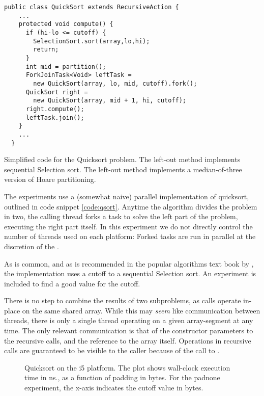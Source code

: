 \begin{code}
\begin{Verbatim}[frame=single]
  public class QuickSort extends RecursiveAction {
    ...
    protected void compute() {
      if (hi-lo <= cutoff) {
        SelectionSort.sort(array,lo,hi);
        return;
      }
      int mid = partition();
      ForkJoinTask<Void> leftTask =
        new QuickSort(array, lo, mid, cutoff).fork();
      QuickSort right =
        new QuickSort(array, mid + 1, hi, cutoff);
      right.compute();
      leftTask.join();
    }
    ...
  }
\end{Verbatim}
	\caption{Simplified code for the Quicksort problem. The left-out
	 method implements sequential Selection sort.
	The left-out  method implements a median-of-three
	version of Hoare partitioning.}
	\label{code:qsort}
\end{code}

The experiments use a (somewhat naive) parallel implementation of quicksort,
outlined in code snippet \ref{code:qsort}.
Anytime the algorithm divides the problem in two, the calling thread forks a
task to solve the left part of the problem, executing the right part itself.
In this experiment we do not directly control the number of threads used on each
platform: Forked tasks are run in parallel at the discretion of the
.

As is common, and as is recommended in the popular algorithms text book by
\citet{sedgewick}, the implementation uses a cutoff to a sequential Selection
sort. An experiment is included to find a good value for the cutoff.

There is no step to combine the results of two subproblems, as calls operate
in-place on the same shared array. While this may \textit{seem} like communication
between threads, there is only a single thread operating on a given
array-segment at any time. The only relevant communication is that of the
constructor parameters to the recursive calls, and the reference to the array
itself. Operations in recursive calls are guaranteed to be visible to the caller
because of the call to .

\begin{figure}[hbpt]
\graphicspath{{plots/}}

	\caption{Quicksort on the i5 platform. The plot shows wall-clock execution time in
	ns., as a function of padding in bytes. For the padnone experiment, the
	x-axis indicates the cutoff value in bytes.}
	\label{fig:qsort-i5}
\end{figure}

